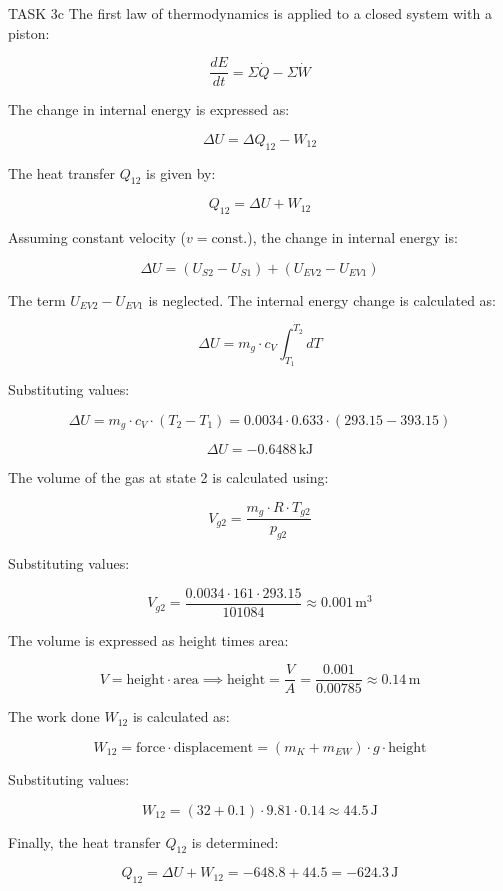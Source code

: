 TASK 3c  
The first law of thermodynamics is applied to a closed system with a piston:  

\[
\frac{dE}{dt} = \Sigma \dot{Q} - \Sigma \dot{W}
\]  

The change in internal energy is expressed as:  

\[
\Delta U = \Delta Q_{12} - W_{12}
\]  

The heat transfer \( Q_{12} \) is given by:  

\[
Q_{12} = \Delta U + W_{12}
\]  

Assuming constant velocity (\( v = \text{const.} \)), the change in internal energy is:  

\[
\Delta U = (U_{S2} - U_{S1}) + (U_{EV2} - U_{EV1})
\]  

The term \( U_{EV2} - U_{EV1} \) is neglected. The internal energy change is calculated as:  

\[
\Delta U = m_g \cdot c_V \int_{T_1}^{T_2} dT
\]  

Substituting values:  

\[
\Delta U = m_g \cdot c_V \cdot (T_2 - T_1) = 0.0034 \cdot 0.633 \cdot (293.15 - 393.15)
\]  

\[
\Delta U = -0.6488 \, \text{kJ}
\]  

The volume of the gas at state 2 is calculated using:  

\[
V_{g2} = \frac{m_g \cdot R \cdot T_{g2}}{p_{g2}}
\]  

Substituting values:  

\[
V_{g2} = \frac{0.0034 \cdot 161 \cdot 293.15}{101084} \approx 0.001 \, \text{m}^3
\]  

The volume is expressed as height times area:  

\[
V = \text{height} \cdot \text{area} \implies \text{height} = \frac{V}{A} = \frac{0.001}{0.00785} \approx 0.14 \, \text{m}
\]  

The work done \( W_{12} \) is calculated as:  

\[
W_{12} = \text{force} \cdot \text{displacement} = (m_K + m_{EW}) \cdot g \cdot \text{height}
\]  

Substituting values:  

\[
W_{12} = (32 + 0.1) \cdot 9.81 \cdot 0.14 \approx 44.5 \, \text{J}
\]  

Finally, the heat transfer \( Q_{12} \) is determined:  

\[
Q_{12} = \Delta U + W_{12} = -648.8 + 44.5 = -624.3 \, \text{J}
\]  
